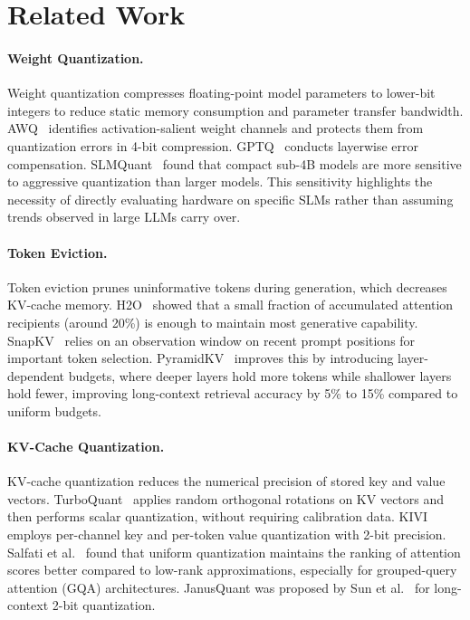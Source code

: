 \documentclass[sigconf,nonacm]{acmart}
\begin{document}
\section{Related Work}

\paragraph{Weight Quantization.}
Weight quantization compresses floating-point model parameters to lower-bit integers to reduce static memory consumption and parameter transfer bandwidth. AWQ~\cite{lin_awq_2025} identifies activation-salient weight channels and protects them from quantization errors in 4-bit compression. GPTQ~\cite{frantar_gptq_2023} conducts layerwise error compensation. SLMQuant~\cite{wang_slmquant_2025} found that compact sub-4B models are more sensitive to aggressive quantization than larger models. This sensitivity highlights the necessity of directly evaluating hardware on specific SLMs rather than assuming trends observed in large LLMs carry over.

\paragraph{Token Eviction.}
Token eviction prunes uninformative tokens during generation, which decreases KV-cache memory. H2O~\cite{zhang_h2o_2023} showed that a small fraction of accumulated attention recipients (around 20\%) is enough to maintain most generative capability. SnapKV~\cite{li_snapkv_2024} relies on an observation window on recent prompt positions for important token selection. PyramidKV~\cite{cai_pyramidkv_2025} improves this by introducing layer-dependent budgets, where deeper layers hold more tokens while shallower layers hold fewer, improving long-context retrieval accuracy by 5\% to 15\% compared to uniform budgets.

\paragraph{KV-Cache Quantization.}
KV-cache quantization reduces the numerical precision of stored key and value vectors. TurboQuant~\cite{zandieh2026turboquant} applies random orthogonal rotations on KV vectors and then performs scalar quantization, without requiring calibration data. KIVI~\cite{liu_kivi_2023} employs per-channel key and per-token value quantization with 2-bit precision. Salfati et al.~\cite{salfati_quantization_2026} found that uniform quantization maintains the ranking of attention scores better compared to low-rank approximations, especially for grouped-query attention (GQA) architectures. JanusQuant was proposed by Sun et al.~\cite{sun2026janusquant} for long-context 2-bit quantization.
\end{document}
